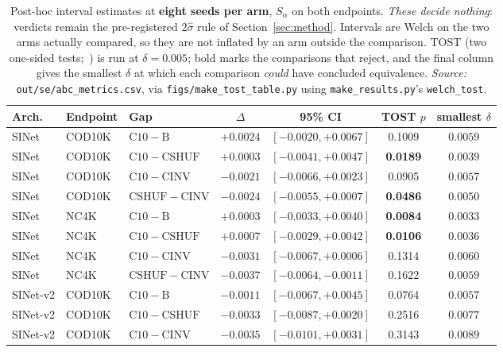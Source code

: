 \begin{table}[t]
\caption{Post-hoc interval estimates at \textbf{eight seeds per arm}, $S_\alpha$ on both endpoints.
\emph{These decide nothing}: verdicts remain the pre-registered $2\hat{\sigma}$ rule of
Section~\ref{sec:method}. Intervals are Welch on the two arms actually compared, so they are not
inflated by an arm outside the comparison. TOST (two one-sided tests;~\citealp{lakens2017equivalence}) is run at $\delta = 0.005$; bold marks the
comparisons that reject, and the final column gives the smallest $\delta$ at which each comparison
\emph{could} have concluded equivalence. \emph{Source:} \texttt{out/se/abc\_metrics.csv}, via
\texttt{figs/make\_tost\_table.py} using \texttt{make\_results.py}'s \texttt{welch\_tost}.}
\label{tab:tost}
\begin{center}
\footnotesize
\setlength{\tabcolsep}{4pt}
\begin{tabular}{@{}lllcccc@{}}
\toprule
Arch. & Endpoint & Gap & $\Delta$ & 95\% CI & TOST $p$ & smallest $\delta$ \\
\midrule
SINet & COD10K & $\mathrm{C10}-\mathrm{B}$ & $+0.0024$ & $[-0.0020, +0.0067]$ & 0.1009 & $0.0059$ \\
SINet & COD10K & $\mathrm{C10}-\mathrm{CSHUF}$ & $+0.0003$ & $[-0.0041, +0.0047]$ & \textbf{0.0189} & $0.0039$ \\
SINet & COD10K & $\mathrm{C10}-\mathrm{CINV}$ & $-0.0021$ & $[-0.0066, +0.0023]$ & 0.0905 & $0.0057$ \\
SINet & COD10K & $\mathrm{CSHUF}-\mathrm{CINV}$ & $-0.0024$ & $[-0.0055, +0.0007]$ & \textbf{0.0486} & $0.0050$ \\
\midrule
SINet & NC4K & $\mathrm{C10}-\mathrm{B}$ & $+0.0003$ & $[-0.0033, +0.0040]$ & \textbf{0.0084} & $0.0033$ \\
SINet & NC4K & $\mathrm{C10}-\mathrm{CSHUF}$ & $+0.0007$ & $[-0.0029, +0.0042]$ & \textbf{0.0106} & $0.0036$ \\
SINet & NC4K & $\mathrm{C10}-\mathrm{CINV}$ & $-0.0031$ & $[-0.0067, +0.0006]$ & 0.1314 & $0.0060$ \\
SINet & NC4K & $\mathrm{CSHUF}-\mathrm{CINV}$ & $-0.0037$ & $[-0.0064, -0.0011]$ & 0.1622 & $0.0059$ \\
\midrule
SINet-v2 & COD10K & $\mathrm{C10}-\mathrm{B}$ & $-0.0011$ & $[-0.0067, +0.0045]$ & 0.0764 & $0.0057$ \\
SINet-v2 & COD10K & $\mathrm{C10}-\mathrm{CSHUF}$ & $-0.0033$ & $[-0.0087, +0.0020]$ & 0.2516 & $0.0077$ \\
SINet-v2 & COD10K & $\mathrm{C10}-\mathrm{CINV}$ & $-0.0035$ & $[-0.0101, +0.0031]$ & 0.3143 & $0.0089$ \\

\end{tabular}
\end{center}
\end{table}
